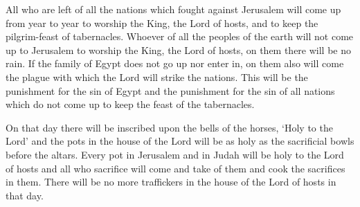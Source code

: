  All who are left of all the nations which fought against
Jerusalem will come up from year to year to worship the King, the Lord
of hosts, and to keep the pilgrim-feast of tabernacles. 
Whoever of all the peoples of the earth will not come up to Jerusalem to
worship the King, the Lord of hosts, on them there will be no rain.
 If the family of Egypt does not go up nor enter in, on
them also will come the plague with which the Lord will strike the
nations.  This will be the punishment for the sin of Egypt
and the punishment for the sin of all nations which do not come up to
keep the feast of the tabernacles.

 On that day there will be inscribed upon the bells of the
horses, `Holy to the Lord' and the pots in the house of the Lord will be
as holy as the sacrificial bowls before the altars.  Every
pot in Jerusalem and in Judah will be holy to the Lord of hosts and all
who sacrifice will come and take of them and cook the sacrifices in
them. There will be no more traffickers in the house of the Lord of
hosts in that day.
